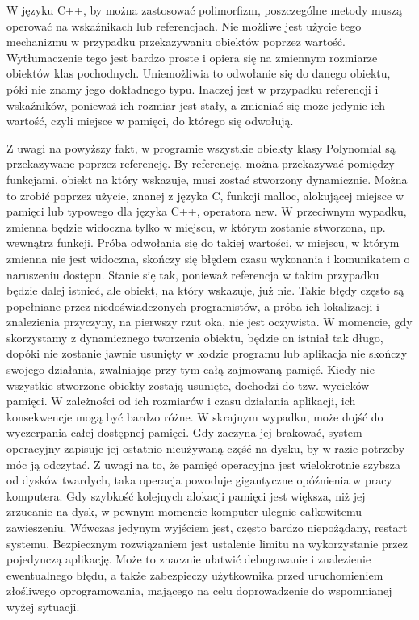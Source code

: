 \documentclass[oneside,a4paper]{book}
\begin{document}
	W języku C++, by można zastosować polimorfizm, poszczególne metody muszą operować na wskaźnikach lub referencjach. Nie możliwe jest użycie tego mechanizmu w przypadku przekazywaniu obiektów poprzez wartość. Wytłumaczenie tego jest bardzo proste i opiera się na zmiennym rozmiarze obiektów klas pochodnych. Uniemożliwia to odwołanie się do danego obiektu, póki nie znamy jego dokładnego typu. Inaczej jest w przypadku referencji i wskaźników, ponieważ ich rozmiar jest stały, a zmieniać się może jedynie ich wartość, czyli miejsce w pamięci, do którego się odwołują.
	
	Z uwagi na powyższy fakt, w programie wszystkie obiekty klasy Polynomial są przekazywane poprzez referencję. By referencję, można przekazywać pomiędzy funkcjami, obiekt na który wskazuje, musi zostać stworzony dynamicznie. Można to zrobić poprzez użycie, znanej z języka C, funkcji malloc, alokującej miejsce w pamięci lub typowego dla języka C++, operatora new. W przeciwnym wypadku, zmienna będzie widoczna tylko w miejscu, w którym zostanie stworzona, np. wewnątrz funkcji. Próba odwołania się do takiej wartości, w miejscu, w którym zmienna nie jest widoczna, skończy się błędem czasu wykonania i komunikatem o naruszeniu dostępu. Stanie się tak, ponieważ referencja w takim przypadku będzie dalej istnieć, ale obiekt, na który wskazuje, już nie. Takie błędy często są popełniane przez niedoświadczonych programistów, a próba ich lokalizacji i znalezienia przyczyny, na pierwszy rzut oka, nie jest oczywista. W momencie, gdy skorzystamy z dynamicznego tworzenia obiektu, będzie on istniał tak długo, dopóki nie zostanie jawnie usunięty w kodzie programu lub aplikacja nie skończy swojego działania, zwalniając przy tym całą zajmowaną pamięć. Kiedy nie wszystkie stworzone obiekty zostają usunięte, dochodzi do tzw. wycieków pamięci. W zależności od ich rozmiarów i czasu działania aplikacji, ich konsekwencje mogą być bardzo różne. W skrajnym wypadku, może dojść do wyczerpania całej dostępnej pamięci. Gdy zaczyna jej brakować, system operacyjny zapisuje jej ostatnio nieużywaną część na dysku, by w razie potrzeby móc ją odczytać. Z uwagi na to, że pamięć operacyjna jest wielokrotnie szybsza od dysków twardych, taka operacja powoduje gigantyczne opóźnienia w pracy komputera. Gdy szybkość kolejnych alokacji pamięci jest większa, niż jej zrzucanie na dysk, w pewnym momencie komputer ulegnie całkowitemu zawieszeniu. Wówczas jedynym wyjściem jest, często bardzo niepożądany, restart systemu. Bezpiecznym rozwiązaniem jest ustalenie limitu na wykorzystanie przez pojedynczą aplikację. Może to znacznie ułatwić debugowanie i znalezienie ewentualnego błędu, a także zabezpieczy użytkownika przed uruchomieniem złośliwego oprogramowania, mającego na celu doprowadzenie do wspomnianej wyżej sytuacji.
	
\end{document}
